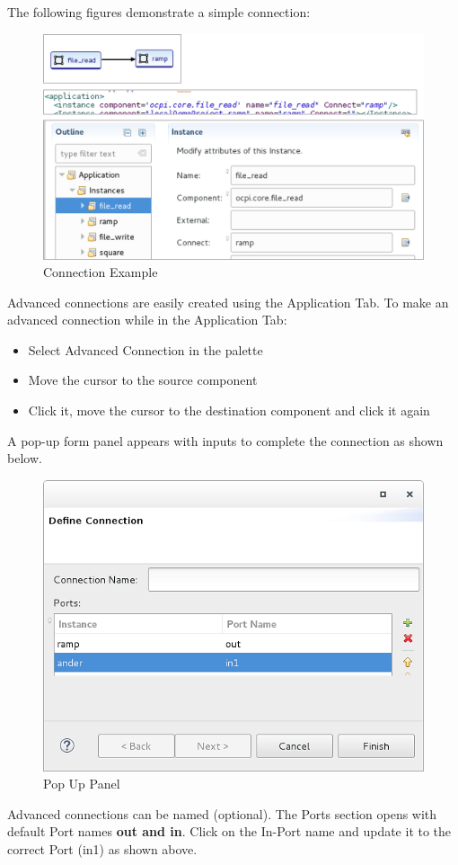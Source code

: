 \documentclass[10pt, a4paper, oneside]{article}
\begin{document}
The following figures demonstrate a simple connection:\\
\begin{figure}[h!]
	\centering
	\caption{Connection Example}{}
	\includegraphics[width=\textwidth]{ConnectionExample.png}
 \end{figure}
Advanced connections are easily created using the Application Tab. To make an advanced connection while in the Application Tab:
\begin{itemize}
\item	Select Advanced Connection in the palette
\item	Move the cursor to the source component
\item	Click it, move the cursor to the destination component and click it again
\end{itemize}
A pop-up form panel appears with inputs to complete the connection as shown below.
\begin{figure}[h!]
	\centering
	\caption{Pop Up Panel}{}
	\includegraphics[width=.65\textwidth]{PopUpPanel.png}
 \end{figure}
Advanced connections can be named (optional). The Ports section opens with default Port names \textbf{out and in}. Click on the In-Port name and update it to the correct Port (in1) as shown above.\\
\end{document}
